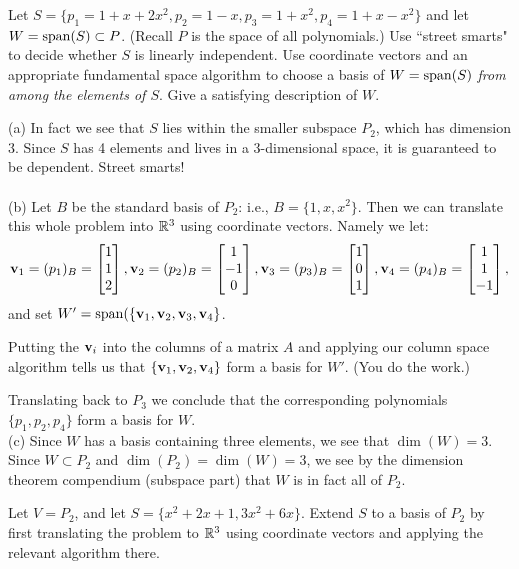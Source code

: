 \ii Let $S=\{p_1=1+x+2x^2,p_2=1-x,p_3=1+x^2,p_4=1+x-x^2\}$ and let $W=\operatorname{span}(S)\subset P$.  (Recall $P$ is the space of all polynomials.) 
\bb
\ii Use ``street smarts" to decide whether $S$ is linearly independent. 
\ii Use coordinate vectors and an appropriate fundamental space algorithm to choose a basis of $W=\operatorname{span}(S)$ {\em from among the elements of $S$}.
\ii Give a satisfying description of $W$. 
\ee
\begin{solution}
\noindent 
(a) In fact we see that $S$ lies within the smaller subspace $P_2$, which has dimension $3$. Since $S$ has 4 elements and lives in a 3-dimensional space, it is guaranteed to be dependent. Street smarts! 
\\ \\
(b) Let $B$ be the standard basis of $P_2$: i.e., $B=\{1,x,x^2\}$. Then we can translate this whole problem into ${\mathbb R}^3$ using coordinate vectors. Namely we let:
\[
{\mathbf v}_1=(p_1)_B=\begin{bmatrix}
1\\ 1\\ 2
\end{bmatrix}, {\mathbf v}_2=(p_2)_B=\begin{bmatrix}
1\\ -1\\ 0
\end{bmatrix}, {\mathbf v}_3=(p_3)_B=\begin{bmatrix}
1\\0 \\ 1
\end{bmatrix}, {\mathbf v}_4=(p_4)_B=\begin{bmatrix}
1\\ 1\\ -1
\end{bmatrix},
\]
and set $W'=\operatorname{span}(\{{\mathbf v}_1,{\mathbf v}_2,{\mathbf v}_3,{\mathbf v}_4\}$. 

Putting the ${\mathbf v}_i$ into the columns of a matrix $A$ and applying our column space algorithm tells us that $\{{\mathbf v}_1,{\mathbf v}_2,{\mathbf v}_4\}$ form a basis for $W'$. (You do the work.) 

Translating back to $P_3$ we conclude that the corresponding polynomials $\{p_1,p_2,p_4\}$ form a basis for $W$. 
\\
(c) Since $W$ has a basis containing three elements, we see that $\dim(W)=3$. Since $W\subset P_2$ and $\dim(P_2)=\dim(W)=3$, we see by the dimension theorem compendium (subspace part)  that $W$ is in fact all of $P_2$. 
\end{solution}
\ii Let $V=P_2$, and let $S=\{x^2+2x+1, 3x^2+6x \}$. Extend $S$ to a basis of $P_2$ by first translating the problem to ${\mathbb R}^3$ using coordinate vectors and applying the relevant algorithm there. 
